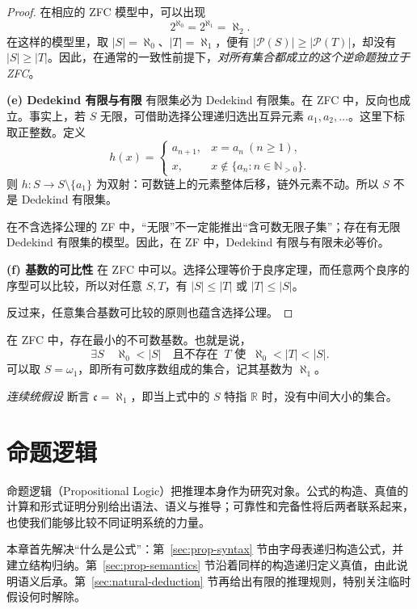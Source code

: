 \documentclass[lang=cn,a4paper,fontset=none,zihao=false,10pt,openany,twoside]{beautybook}
\numberwithin{algorithm}{chapter}
\newcommand{\N}{\mathbb N}
\newcommand{\R}{\mathbb R}
\newcommand{\Pow}{\mathcal P}
\begin{document}
\begin{proof}
在相应的 ZFC 模型中，可以出现
\[
 2^{\aleph_0}=2^{\aleph_1}=\aleph_2.
\]
在这样的模型里，取 $|S|=\aleph_0$、$|T|=\aleph_1$，便有 $|\Pow(S)|\geq|\Pow(T)|$，却没有 $|S|\geq|T|$。因此，在通常的一致性前提下，\emph{对所有集合都成立的这个逆命题独立于 ZFC}。

\par\smallskip\noindent\textbf{(e) Dedekind 有限与有限}\quad 
有限集必为 Dedekind 有限集。在 ZFC 中，反向也成立。事实上，若 $S$ 无限，可借助选择公理递归选出互异元素 $a_1,a_2,\ldots$。这里下标取正整数。定义
\[
 h(x)=\begin{cases}a_{n+1},&x=a_n\ (n\ge1),\\x,&x\notin\{a_n:n\in\N_{>0}\}.\end{cases}
\]
则 $h:S\to S\setminus\{a_1\}$ 为双射：可数链上的元素整体后移，链外元素不动。所以 $S$ 不是 Dedekind 有限集。


在不含选择公理的 ZF 中，“无限”不一定能推出“含可数无限子集”；存在有无限 Dedekind 有限集的模型。因此，在 ZF 中，Dedekind 有限与有限未必等价。

\par\smallskip\noindent\textbf{(f) 基数的可比性}\quad 
在 ZFC 中可以。选择公理等价于良序定理，而任意两个良序的序型可以比较，所以对任意 $S,T$，有 $|S|\leq|T|$ 或 $|T|\leq|S|$。

反过来，任意集合基数可比较的原则也蕴含选择公理。
\end{proof}

在 ZFC 中，存在最小的不可数基数。也就是说，
\[
 \exists S\quad\aleph_0<|S|\quad\text{且不存在 }\ T\text{ 使 }\ \aleph_0<|T|<|S|.
\]
可以取 $S=\omega_1$，即所有可数序数组成的集合，记其基数为 $\aleph_1$。

\emph{连续统假设} 断言 $\mathfrak c=\aleph_1$，即当上式中的 $S$ 特指 $\R$ 时，没有中间大小的集合。

\chapter{命题逻辑}\label{chap:propositional-logic}
\begin{wenxintishi}
命题逻辑（Propositional Logic）把推理本身作为研究对象。公式的构造、真值的计算和形式证明分别给出语法、语义与推导；可靠性和完备性将后两者联系起来，也使我们能够比较不同证明系统的力量。
\end{wenxintishi}
本章首先解决“什么是公式”：第~\ref{sec:prop-syntax} 节由字母表递归构造公式，并建立结构归纳。第~\ref{sec:prop-semantics} 节沿着同样的构造递归定义真值，由此说明语义后承。第~\ref{sec:natural-deduction} 节再给出有限的推理规则，特别关注临时假设何时解除。
\end{document}

